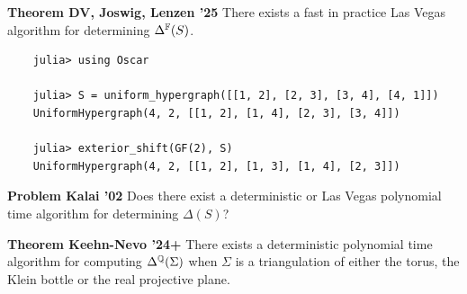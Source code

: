 \documentclass[9pt]{beamer}
\renewenvironment{theorem}[1][]
{\textcolor{LineColor}{\textbf{Theorem #1}} }
{}
\renewenvironment{problem}[1][]
{\textcolor{LineColor}{\textbf{Problem #1}} }
{}
\begin{document}
\begin{frame}[fragile]
  \begin{theorem}[DV, Joswig, Lenzen '25]
    There exists a fast in practice Las Vegas algorithm for determining $\Delta^{{\mathbb F}}(S)$.
  \end{theorem}

  \begin{verbatim}
    julia> using Oscar

    julia> S = uniform_hypergraph([[1, 2], [2, 3], [3, 4], [4, 1]])
    UniformHypergraph(4, 2, [[1, 2], [1, 4], [2, 3], [3, 4]])

    julia> exterior_shift(GF(2), S)
    UniformHypergraph(4, 2, [[1, 2], [1, 3], [1, 4], [2, 3]])
  \end{verbatim}
  \pause
  \vspace{8mm}
  \begin{problem}[Kalai '02]
    Does there exist a deterministic or Las Vegas polynomial time algorithm for determining $\Delta(S)$?
  \end{problem}
  \vspace{8mm}
  
  \begin{theorem}[Keehn-Nevo '24+]
    There exists a deterministic polynomial time algorithm for computing $\Delta^{{\mathbb Q}}(\Sigma)$ when $\Sigma$ is a triangulation of either the torus, the Klein bottle or the real projective plane.
  \end{theorem}

\end{frame}

\end{document}
